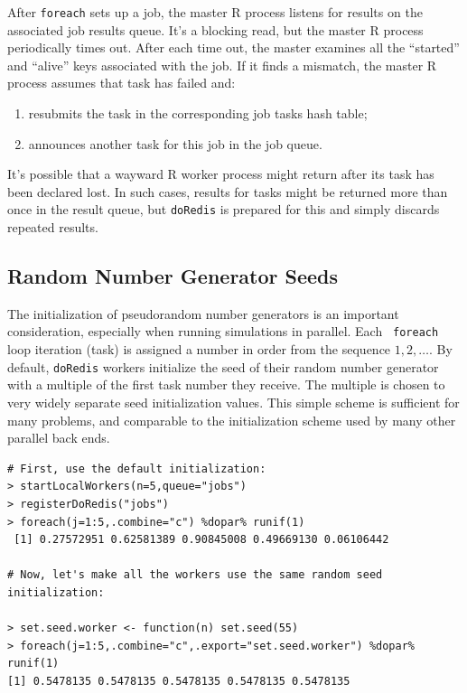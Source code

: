 \documentclass[12pt]{article}
\begin{document}
After \verb+foreach+ sets up a job, the master R process listens for results on
the associated job results queue. It's a blocking read, but the master R
process periodically times out. After each time out, the master examines all
the ``started'' and ``alive'' keys associated with the job. If it finds a
mismatch, the master R process assumes that task has failed and:
\begin{enumerate}
\item resubmits the task in the corresponding job tasks hash table;
\item announces another task for this job in the job queue.
\end{enumerate}

It's possible that a wayward R worker process might return after its task has
been declared lost. In such cases, results for tasks might be returned more
than once in the result queue, but \verb+doRedis+ is prepared for this and
simply discards repeated results.


\subsection{Random Number Generator Seeds}

The initialization of pseudorandom number generators is an important
consideration, especially when running simulations in parallel. Each {\tt
foreach} loop iteration (task) is assigned a number in order from the sequence
$1, 2, \ldots$. By default, {\tt doRedis} workers initialize the seed of their
random number generator with a multiple  of the first task number they receive.
The multiple is chosen to very widely separate seed initialization values.
This simple scheme is sufficient for many problems, and comparable to
the initialization scheme used by many other parallel back ends.

\begin{lstlisting}[float=!ht,caption=User-defined RNG initialization,label=rng]
# First, use the default initialization:
> startLocalWorkers(n=5,queue="jobs")
> registerDoRedis("jobs")
> foreach(j=1:5,.combine="c") %dopar% runif(1)
 [1] 0.27572951 0.62581389 0.90845008 0.49669130 0.06106442 

# Now, let's make all the workers use the same random seed initialization:

> set.seed.worker <- function(n) set.seed(55)
> foreach(j=1:5,.combine="c",.export="set.seed.worker") %dopar% runif(1)
[1] 0.5478135 0.5478135 0.5478135 0.5478135 0.5478135
\end{lstlisting}
\end{document}
